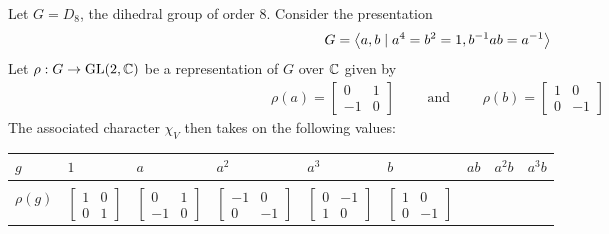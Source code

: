\begin{boxexample}
    Let $G = D_8$, the dihedral group of order $8$. Consider the presentation
    \begin{align*}
        G = \left\langle a, b \mid a^4 = b^2 = 1, b^{-1} a b = a^{-1} \right\rangle
    \end{align*}
    Let $\rho : G \to \operatorname{GL}\!\left( 2, \mathbb{C} \right)$ be a representation of $G$ over $\mathbb{C}$ given by
    \begin{align*}
        \rho(a) = \begin{bmatrix}
            0 & 1 \\ -1 & 0
        \end{bmatrix}
        \quad\quad \text{ and } \quad\quad
        \rho(b) = \begin{bmatrix}
            1 & 0 \\ 0 & -1
        \end{bmatrix}
    \end{align*}
    The associated character $\chi_V$ then takes on the following values:
    \begin{table}[H]
        \centering
        \hspace{-0.3cm}
        \begin{tabular}{C{1.1cm}|C{1.1cm} C{1.38cm} C{1.67cm} C{1.38cm} C{1.38cm} C{1.67cm} C{1.38cm} C{1.1cm}}
            $g$ & $1$ & $a$ & $a^2$ & $a^3$ & $b$ & $ab$ & $a^2 b$ & $a^3 b$ \\
            \hline \\[-11pt]
            $\rho(g)$ & \footnotesize 
            $\begin{bmatrix} 1 & 0 \\ 0 & 1 \end{bmatrix}$
            & \footnotesize
            $\begin{bmatrix} 0 & 1 \\ -1 & 0 \end{bmatrix}$
            & \footnotesize
            $\begin{bmatrix} -1 & 0 \\ 0 & -1 \end{bmatrix}$
            & \footnotesize
            $\begin{bmatrix} 0 & -1 \\ 1 & 0 \end{bmatrix}$
            & \footnotesize
            $\begin{bmatrix} 1 & 0 \\ 0 & -1 \end{bmatrix}$

\end{tabular}
\end{table}
\end{boxexample}
